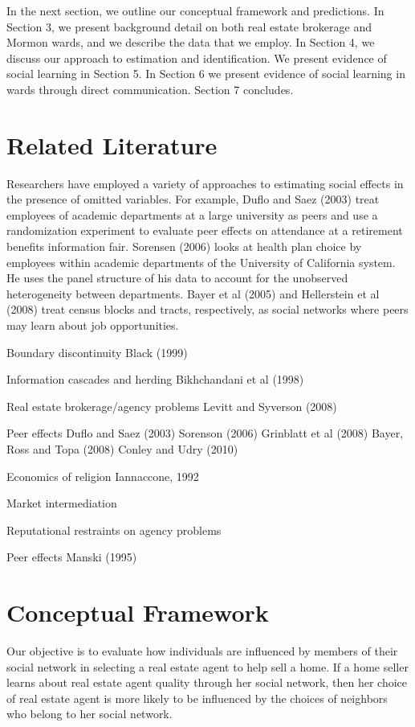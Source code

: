 \documentclass[12pt]{article}
\begin{document}
    In the next section, we outline our conceptual framework and predictions. In Section 3, we present background detail on both real estate brokerage
    and Mormon wards, and we describe the data that we employ. In Section 4, we discuss our approach to estimation and identification.  We
    present evidence of social learning in Section 5. In Section 6 we present evidence of social learning in wards through direct communication.
    Section 7 concludes.
    
\section{Related Literature}

Researchers have employed a variety of approaches to estimating social effects in the presence of omitted variables. For example, Duflo and Saez (2003) treat employees of academic departments at a large university as peers and use a randomization experiment to evaluate peer effects on attendance at a retirement benefits information fair. Sorensen (2006) looks at health plan choice by employees within academic departments of the University of California system. He uses the panel structure of his data to account for the unobserved heterogeneity between departments.
    Bayer et al (2005) and Hellerstein et al (2008) treat census blocks and tracts, respectively, as social networks where peers may learn  about job opportunities.

Boundary discontinuity
Black (1999)

Information cascades and herding
Bikhchandani et al (1998)

Real estate brokerage/agency problems
Levitt and Syverson (2008)

Peer effects
Duflo and Saez (2003)
Sorenson (2006)
Grinblatt et al (2008)
Bayer, Ross and Topa (2008)
Conley and Udry (2010)
    
Economics of religion
Iannaccone, 1992

Market intermediation

Reputational restraints on agency problems

Peer effects
Manski (1995)

\section{Conceptual Framework}

    Our objective is to evaluate how individuals are influenced by members of their social network in selecting a real estate agent to help sell a
    home. If a home seller learns about real estate agent quality through her social network, then her choice of real estate agent is more likely
    to be influenced by the choices of neighbors who belong to her social network.
\end{document}
